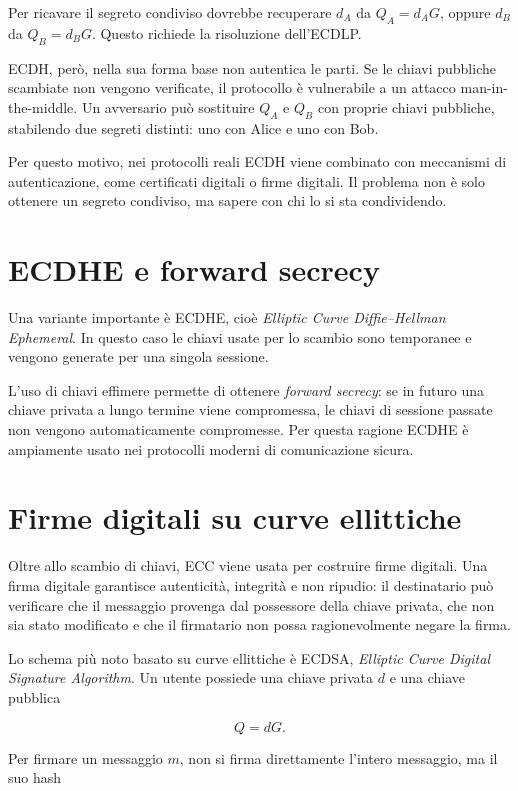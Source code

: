 \documentclass[12pt,a4paper,oneside]{report}
\begin{document}
Per ricavare il segreto condiviso dovrebbe recuperare \(d_A\) da \(Q_A=d_A G\), oppure \(d_B\) da \(Q_B=d_B G\). Questo richiede la risoluzione dell'ECDLP.

ECDH, però, nella sua forma base non autentica le parti. Se le chiavi pubbliche scambiate non vengono verificate, il protocollo è vulnerabile a un attacco man-in-the-middle. Un avversario può sostituire \(Q_A\) e \(Q_B\) con proprie chiavi pubbliche, stabilendo due segreti distinti: uno con Alice e uno con Bob.

Per questo motivo, nei protocolli reali ECDH viene combinato con meccanismi di autenticazione, come certificati digitali o firme digitali. Il problema non è solo ottenere un segreto condiviso, ma sapere con chi lo si sta condividendo.

\section{ECDHE e forward secrecy}

Una variante importante è ECDHE, cioè \textit{Elliptic Curve Diffie--Hellman Ephemeral}. In questo caso le chiavi usate per lo scambio sono temporanee e vengono generate per una singola sessione.

L'uso di chiavi effimere permette di ottenere \textit{forward secrecy}: se in futuro una chiave privata a lungo termine viene compromessa, le chiavi di sessione passate non vengono automaticamente compromesse. Per questa ragione ECDHE è ampiamente usato nei protocolli moderni di comunicazione sicura.

\section{Firme digitali su curve ellittiche}

Oltre allo scambio di chiavi, ECC viene usata per costruire firme digitali. Una firma digitale garantisce autenticità, integrità e non ripudio: il destinatario può verificare che il messaggio provenga dal possessore della chiave privata, che non sia stato modificato e che il firmatario non possa ragionevolmente negare la firma.

Lo schema più noto basato su curve ellittiche è ECDSA, \textit{Elliptic Curve Digital Signature Algorithm}. Un utente possiede una chiave privata \(d\) e una chiave pubblica

\[
Q=dG.
\]

Per firmare un messaggio \(m\), non si firma direttamente l'intero messaggio, ma il suo hash
\end{document}
